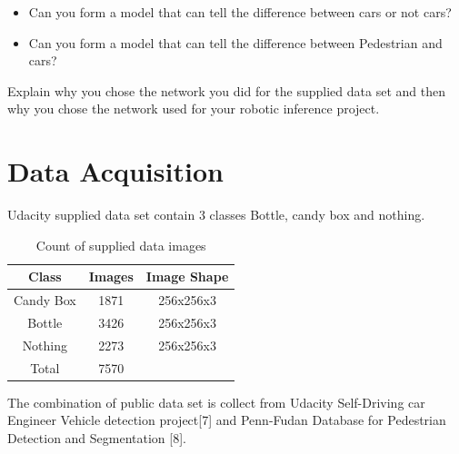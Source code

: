 \documentclass[10pt,journal,compsoc]{IEEEtran}
\begin{document}
\begin{itemize}
\item Can you form a model that can tell the difference between cars or not cars?
\item Can you form a model that can tell the difference between Pedestrian and cars?
\end {itemize}
 
Explain why you chose the network you did for the supplied data set and then why you chose the network used for your robotic inference project. \cite{lamport1994latex}

\section{Data Acquisition}
Udacity supplied data set contain 3 classes Bottle, candy box and nothing.
\begin{table}[h]
 \begin{center}
      \begin{tabular}{ |c|c|c| } 
       \hline
       Class & Images & Image Shape \\
       \hline
       Candy Box & 1871 & 256x256x3 \\ 
       Bottle & 3426 & 256x256x3 \\ 
       Nothing & 2273 & 256x256x3 \\
       \hline
       Total & 7570 & \\
       \hline
      \end{tabular}
      \caption{Count of supplied data images}
      \label{table:1}
      \end{center}
      \end{table}
The combination of public data set is collect from Udacity Self-Driving car Engineer Vehicle detection project[7] and Penn-Fudan Database for Pedestrian Detection and Segmentation [8].
\end{document}

